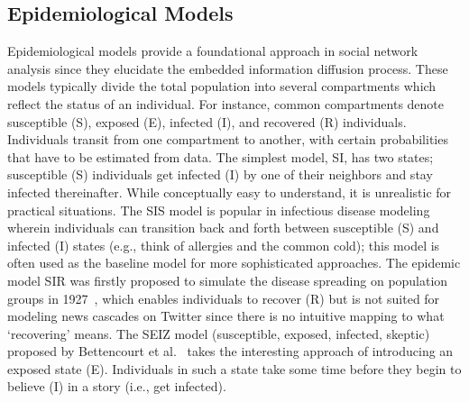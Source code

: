 \subsection{Epidemiological Models}
Epidemiological models provide a foundational approach in social network analysis since they elucidate the embedded information diffusion process.
These models typically divide the total population into several compartments
which reflect the status of an individual. For instance, common compartments
denote susceptible (S), exposed (E), infected (I), and
recovered (R) individuals. Individuals transit from one compartment to another, with
certain probabilities that have to be estimated from data.
The simplest model, SI, has two states; susceptible (S) individuals get infected (I) by one of their neighbors and stay infected thereinafter. While conceptually easy to understand, it is unrealistic for practical situations.
The SIS model is popular in infectious disease modeling wherein individuals can transition back and forth between susceptible (S) and infected (I) states (e.g., think of allergies and
the common cold); this model is often used as the baseline model for more sophisticated approaches.
The epidemic model SIR was firstly proposed to simulate the disease spreading on population groups in 1927~\cite{kermack1927contribution}, which enables individuals to recover (R) but is not suited for modeling news cascades on Twitter since there is no intuitive mapping to what `recovering' means.
The SEIZ model (susceptible, exposed, infected, skeptic) proposed by Bettencourt et al.~\cite{powerofgoodidea:2006} takes the interesting approach of introducing an exposed state (E). Individuals in such a state take some time before they begin to believe (I)
in a story (i.e., get infected).


